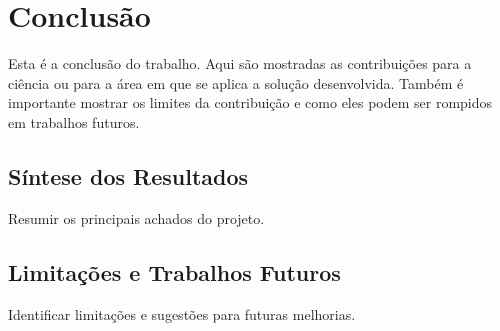 \chapter{Conclusão}
\label{Conclusao}

Esta é a conclusão do trabalho. 
Aqui são mostradas as contribuições para a ciência ou para a área em que se aplica a solução desenvolvida.
Também é importante mostrar os limites da contribuição e como eles podem ser rompidos em trabalhos futuros.

\section{Síntese dos Resultados}
Resumir os principais achados do projeto.

\section{Limitações e Trabalhos Futuros}
Identificar limitações e sugestões para futuras melhorias.